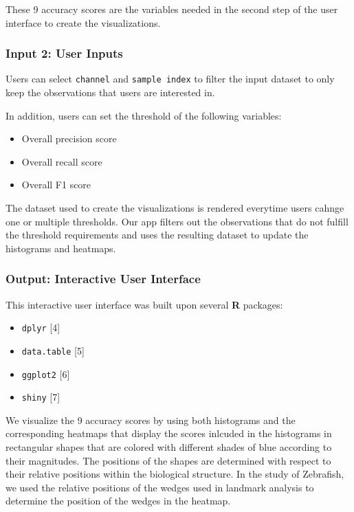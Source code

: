 \documentclass[10pt,letterpaper]{article}
\providecommand{\tightlist}{%
  \setlength{\itemsep}{0pt}\setlength{\parskip}{0pt}}
\begin{document}
These 9 accuracy scores are the variables needed in the second step of
the user interface to create the visualizations.

\subsubsection{Input 2: User Inputs}\label{input-2-user-inputs}

Users can select \texttt{channel} and \texttt{sample\ index} to filter
the input dataset to only keep the observations that users are
interested in.

In addition, users can set the threshold of the following variables:

\begin{itemize}
\tightlist
\item
  Overall precision score
\item
  Overall recall score
\item
  Overall F1 score
\end{itemize}

The dataset used to create the visualizations is rendered everytime
users cahnge one or multiple thresholds. Our app filters out the
observations that do not fulfill the threshold requirements and uses the
resulting dataset to update the histograms and heatmaps.

\subsubsection{Output: Interactive User
Interface}\label{output-interactive-user-interface}

This interactive user interface was built upon several \textbf{R}
packages:

\begin{itemize}
\tightlist
\item
  \texttt{dplyr} {[}4{]}
\item
  \texttt{data.table} {[}5{]}
\item
  \texttt{ggplot2} {[}6{]}
\item
  \texttt{shiny} {[}7{]}
\end{itemize}

We visualize the 9 accuracy scores by using both histograms and the
corresponding heatmaps that display the scores inlcuded in the
histograms in rectangular shapes that are colored with different shades
of blue according to their magnitudes. The positions of the shapes are
determined with respect to their relative positions within the
biological structure. In the study of Zebrafish, we used the relative
positions of the wedges used in landmark analysis to determine the
position of the wedges in the heatmap.
\end{document}

